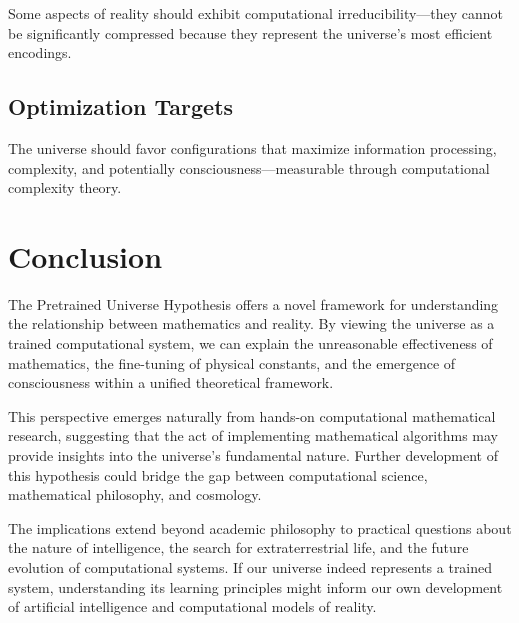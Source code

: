 \documentclass[12pt]{article}
\begin{document}
Some aspects of reality should exhibit computational irreducibility—they cannot be significantly compressed because they represent the universe's most efficient encodings.

\subsection{Optimization Targets}

The universe should favor configurations that maximize information processing, complexity, and potentially consciousness—measurable through computational complexity theory.

\section{Conclusion}

The Pretrained Universe Hypothesis offers a novel framework for understanding the relationship between mathematics and reality. By viewing the universe as a trained computational system, we can explain the unreasonable effectiveness of mathematics, the fine-tuning of physical constants, and the emergence of consciousness within a unified theoretical framework.

This perspective emerges naturally from hands-on computational mathematical research, suggesting that the act of implementing mathematical algorithms may provide insights into the universe's fundamental nature. Further development of this hypothesis could bridge the gap between computational science, mathematical philosophy, and cosmology.

The implications extend beyond academic philosophy to practical questions about the nature of intelligence, the search for extraterrestrial life, and the future evolution of computational systems. If our universe indeed represents a trained system, understanding its learning principles might inform our own development of artificial intelligence and computational models of reality.
\end{document}
